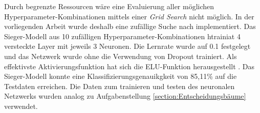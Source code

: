 Durch begrenzte Ressourcen wäre eine Evaluierung aller möglichen Hyperparameter-Kombinationen mittels einer \emph{Grid Search} nicht möglich. In der vorliegenden Arbeit wurde deshalb eine zufällige Suche nach \cite{randomSearch} implementiert. Das Sieger-Modell aus 10 zufälligen Hyperparameter-Kombinationen htrainiat 4 versteckte Layer mit jeweils 3 Neuronen. Die Lernrate wurde auf 0.1 festgelegt und das Netzwerk wurde ohne die Verwendung von Dropout trainiert. Als effektivste Aktivierungsfunktion hat sich die ELU-Funktion herausgestellt \cite{elu}. Das Sieger-Modell konnte eine Klassifizierungsgenauikgkeit von 85,11\% auf die Testdaten erreichen. Die Daten zum trainieren und testen des neuronalen Netzwerks wurden analog zu Aufgabenstellung \ref{section:Entscheidungsbäume} verwendet.

